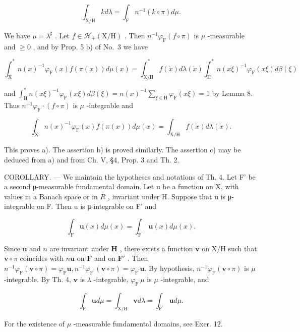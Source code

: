 \[
\int_ {\mathrm{X/H}} k d \lambda = \int_ {\mathrm{F}} n ^ {- 1} (k \circ \pi) d \mu .
\]

We have \(\mu = \lambda^{\sharp}\) . Let \(f \in \mathcal{H}_{+}(\mathrm{X / H})\) . Then \(n^{-1}\varphi_{\mathrm{F}}(f \circ \pi)\) is \(\mu\) -measurable and \(\geqslant 0\) , and by Prop. 5 b) of No.~3 we have

\[
\int_ {\mathrm{X}} ^ {*} n (x) ^ {- 1} \varphi_ {\mathrm{F}} (x) f (\pi (x)) d \mu (x) = \int_ {\mathrm{X/H}} ^ {*} f (\dot {x}) d \lambda (\dot {x}) \int_ {\mathrm{H}} ^ {*} n (x \xi) ^ {- 1} \varphi_ {\mathrm{F}} (x \xi) d \beta (\xi)
\]

and \(\int_{\mathrm{H}}^{*}n(x\xi)^{-1}\varphi_{\mathrm{F}}(x\xi)d\beta (\xi) = n(x)^{-1}\sum_{\xi \in \mathrm{H}}\varphi_{\mathrm{F}}(x\xi) = 1\) by Lemma 8. Thus \(n^{-1}\varphi_{\mathrm{F}}\cdot (f\circ \pi)\) is \(\mu\) -integrable and

\[
\int_ {\mathrm{X}} n (x) ^ {- 1} \varphi_ {\mathrm{F}} (x) f (\pi (x)) d \mu (x) = \int_ {\mathrm{X/H}} f (\dot {x}) d \lambda (\dot {x}).
\]

This proves a). The assertion b) is proved similarly. The assertion c) may be deduced from a) and from Ch. V, §4, Prop. 3 and Th. 2.

COROLLARY. --- We maintain the hypotheses and notations of Th. 4. Let F' be a second μ-measurable fundamental domain. Let u be a function on X, with values in a Banach space or in \(\overline{R}\) , invariant under H. Suppose that u is μ-integrable on F. Then u is μ-integrable on F' and

\[
\int_ {\mathrm{F}} \mathbf {u} (x) d \mu (x) = \int_ {\mathrm{F} ^ {\prime}} \mathbf {u} (x) d \mu (x).
\]

Since \(\mathbf{u}\) and \(n\) are invariant under \(\mathbf{H}\) , there exists a function \(\mathbf{v}\) on \(\mathrm{X / H}\) such that \(\mathbf{v} \circ \pi\) coincides with \(n\mathbf{u}\) on \(\mathbf{F}\) and on \(\mathbf{F}'\) . Then \(n^{-1}\varphi_{\mathrm{F}}(\mathbf{v}\circ \pi) = \varphi_{\mathrm{F}}\mathbf{u}, n^{-1}\varphi_{\mathrm{F}^{\prime}}(\mathbf{v}\circ \pi) = \varphi_{\mathrm{F}^{\prime}}\mathbf{u}.\) By hypothesis, \(n^{-1}\varphi_{\mathrm{F}}(\mathbf{v}\circ \pi)\) is \(\mu\) -integrable. By Th. 4, \(\mathbf{v}\) is \(\lambda\) -integrable, \(\varphi_{\mathrm{F}^{\prime}}\mu\) is \(\mu\) -integrable, and

\[
\int_ {\mathrm{F}} \mathbf {u} d \mu = \int_ {\mathrm{X/H}} \mathbf {v} d \lambda = \int_ {\mathrm{F} ^ {\prime}} \mathbf {u} d \mu .
\]

For the existence of \(\mu\) -measurable fundamental domains, see Exer. 12.

